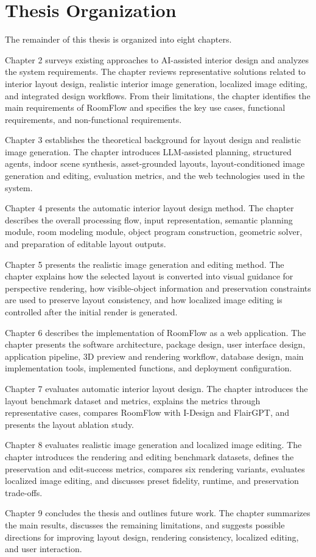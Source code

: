 \section{Thesis Organization}

The remainder of this thesis is organized into eight chapters.

Chapter 2 surveys existing approaches to AI-assisted interior design and analyzes the system requirements. The chapter reviews representative solutions related to interior layout design, realistic interior image generation, localized image editing, and integrated design workflows. From their limitations, the chapter identifies the main requirements of RoomFlow and specifies the key use cases, functional requirements, and non-functional requirements.

Chapter 3 establishes the theoretical background for layout design and realistic image generation. The chapter introduces LLM-assisted planning, structured agents, indoor scene synthesis, asset-grounded layouts, layout-conditioned image generation and editing, evaluation metrics, and the web technologies used in the system.

Chapter 4 presents the automatic interior layout design method. The chapter describes the overall processing flow, input representation, semantic planning module, room modeling module, object program construction, geometric solver, and preparation of editable layout outputs.

Chapter 5 presents the realistic image generation and editing method. The chapter explains how the selected layout is converted into visual guidance for perspective rendering, how visible-object information and preservation constraints are used to preserve layout consistency, and how localized image editing is controlled after the initial render is generated.

Chapter 6 describes the implementation of RoomFlow as a web application. The chapter presents the software architecture, package design, user interface design, application pipeline, 3D preview and rendering workflow, database design, main implementation tools, implemented functions, and deployment configuration.

Chapter 7 evaluates automatic interior layout design. The chapter introduces the layout benchmark dataset and metrics, explains the metrics through representative cases, compares RoomFlow with I-Design and FlairGPT, and presents the layout ablation study.

Chapter 8 evaluates realistic image generation and localized image editing. The chapter introduces the rendering and editing benchmark datasets, defines the preservation and edit-success metrics, compares six rendering variants, evaluates localized image editing, and discusses preset fidelity, runtime, and preservation trade-offs.

Chapter 9 concludes the thesis and outlines future work. The chapter summarizes the main results, discusses the remaining limitations, and suggests possible directions for improving layout design, rendering consistency, localized editing, and user interaction.
